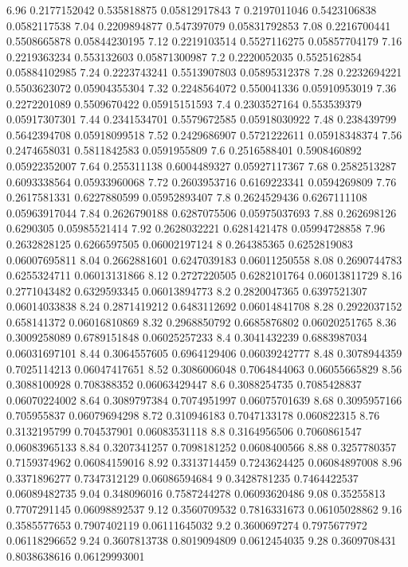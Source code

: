 {6.96 0.2177152042 0.535818875 0.05812917843
7 0.2197011046 0.5423106838 0.0582117538
7.04 0.2209894877 0.547397079 0.05831792853
7.08 0.2216700441 0.5508665878 0.05844230195
7.12 0.2219103514 0.5527116275 0.05857704179
7.16 0.2219363234 0.553132603 0.05871300987
7.2 0.2220052035 0.5525162854 0.05884102985
7.24 0.2223743241 0.5513907803 0.05895312378
7.28 0.2232694221 0.5503623072 0.05904355304
7.32 0.2248564072 0.550041336 0.05910953019
7.36 0.2272201089 0.5509670422 0.05915151593
7.4 0.2303527164 0.553539379 0.05917307301
7.44 0.2341534701 0.5579672585 0.05918030922
7.48 0.238439799 0.5642394708 0.05918099518
7.52 0.2429686907 0.5721222611 0.05918348374
7.56 0.2474658031 0.5811842583 0.0591955809
7.6 0.2516588401 0.5908460892 0.05922352007
7.64 0.255311138 0.6004489327 0.05927117367
7.68 0.2582513287 0.6093338564 0.05933960068
7.72 0.2603953716 0.6169223341 0.0594269809
7.76 0.2617581331 0.6227880599 0.05952893407
7.8 0.2624529436 0.6267111108 0.05963917044
7.84 0.2626790188 0.6287075506 0.05975037693
7.88 0.262698126 0.6290305 0.05985521414
7.92 0.2628032221 0.6281421478 0.05994728858
7.96 0.2632828125 0.6266597505 0.06002197124
8 0.264385365 0.6252819083 0.06007695811
8.04 0.2662881601 0.6247039183 0.06011250558
8.08 0.2690744783 0.6255324711 0.06013131866
8.12 0.2727220505 0.6282101764 0.06013811729
8.16 0.2771043482 0.6329593345 0.06013894773
8.2 0.2820047365 0.6397521307 0.06014033838
8.24 0.2871419212 0.6483112692 0.06014841708
8.28 0.2922037152 0.658141372 0.06016810869
8.32 0.2968850792 0.6685876802 0.06020251765
8.36 0.3009258089 0.6789151848 0.06025257233
8.4 0.3041432239 0.6883987034 0.06031697101
8.44 0.3064557605 0.6964129406 0.06039242777
8.48 0.3078944359 0.7025114213 0.06047417651
8.52 0.3086006048 0.7064844063 0.06055665829
8.56 0.3088100928 0.708388352 0.06063429447
8.6 0.3088254735 0.7085428837 0.06070224002
8.64 0.3089797384 0.7074951997 0.06075701639
8.68 0.3095957166 0.705955837 0.06079694298
8.72 0.310946183 0.7047133178 0.060822315
8.76 0.3132195799 0.704537901 0.06083531118
8.8 0.3164956506 0.7060861547 0.06083965133
8.84 0.3207341257 0.7098181252 0.0608400566
8.88 0.3257780357 0.7159374962 0.06084159016
8.92 0.3313714459 0.7243624425 0.06084897008
8.96 0.3371896277 0.7347312129 0.06086594684
9 0.3428781235 0.7464422537 0.06089482735
9.04 0.348096016 0.7587244278 0.06093620486
9.08 0.35255813 0.7707291145 0.06098892537
9.12 0.3560709532 0.7816331673 0.06105028862
9.16 0.3585577653 0.7907402119 0.06111645032
9.2 0.3600697274 0.7975677972 0.06118296652
9.24 0.3607813738 0.8019094809 0.0612454035
9.28 0.3609708431 0.8038638616 0.06129993001
}
